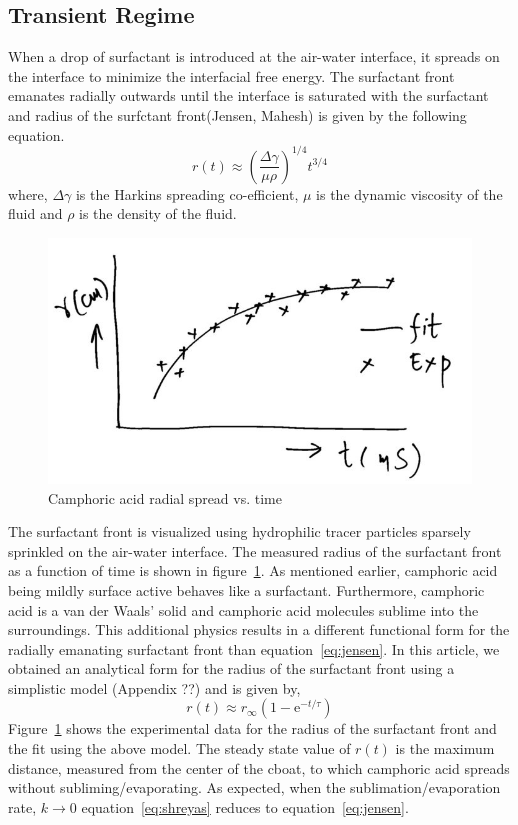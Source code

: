 \documentclass[aps,twocolumn, floatfix, superscriptaddress]{revtex4}
\begin{document}
\subsection{\label{sec:caspread}Transient Regime}
When a drop of surfactant is introduced at the air-water interface, it spreads on the interface to minimize the interfacial free energy. The surfactant front emanates radially outwards until the interface is saturated with the surfactant and radius of the surfctant front(Jensen, Mahesh) is given by the following equation.
\begin{equation} \label{eq:jensen}
r(t) \approx \left(\frac{\Delta \gamma}{\mu \rho}\right)^{1/4} t^{3/4}
\end{equation}
where, $\Delta \gamma$ is the Harkins spreading co-efficient, $\mu$ is the dynamic viscosity of the fluid and $\rho$  is the density of the fluid.  
\begin{figure}[ht]
    \begin{center}
       \includegraphics[scale=0.25]{figure2.jpg}
    \end{center}
    \caption{Camphoric acid radial spread vs. time}
    \label{fig:caspread}
\end{figure}
The surfactant front is visualized using hydrophilic tracer particles sparsely sprinkled on the air-water interface. The measured radius of the surfactant front as a function of time is shown in figure~\ref{fig:caspread}. As mentioned earlier, camphoric acid being mildly surface active behaves like a surfactant. Furthermore, camphoric acid is a van der Waals' solid and camphoric acid molecules sublime into the surroundings. This additional physics results in a different functional form for the radially emanating surfactant front than equation~\ref{eq:jensen}. In this article, we obtained an analytical form for the radius of the surfactant front using a simplistic model (Appendix ??) and is given by,
\begin{equation} \label{eq:shreyas}
r(t) \approx r_{\infty} \left(1-\mathrm{e}^{-t/\tau} \right)
\end{equation}
Figure~\ref{fig:caspread} shows the experimental data for the radius of the surfactant front and the fit using the above model. The steady state value of $r(t)$ is the maximum distance, measured from the center of the cboat, to which camphoric acid spreads without subliming/evaporating. As expected, when the sublimation/evaporation rate, $k\to0$ equation~\ref{eq:shreyas} reduces to equation~\ref{eq:jensen}.
\end{document}
